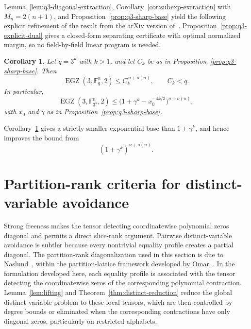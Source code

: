 \documentclass[10pt,a4paper]{amsart}
\newtheorem{corollary}[theorem]{Corollary}
\theoremstyle{definition}
\newcommand{\F}{\mathbb F}
\newcommand{\EGZ}{\operatorname{EGZ}}
\newcommand{\1}{\mathbf 1}
\begin{document}
Lemma~\ref{lem:q3-diagonal-extraction}, Corollary~\ref{cor:subexp-extraction} with $M_n=2(n+1)$, and Proposition~\ref{prop:q3-sharp-base} yield the following explicit refinement of the result from the arXiv version of~\cite{CostaDellaFiore}.  Proposition~\ref{prop:q3-explicit-dual} gives a closed-form separating certificate with optimal normalized margin, so no field-by-field linear program is needed.

\begin{corollary}\label{cor:original-310}
Let $q=3^k$ with $k>1$, and let $C_k$ be as in Proposition~\ref{prop:q3-sharp-base}.  Then
\[
 \EGZ(3,\F_q^n,2)\le C_k^{\,n+o(n)},
 \qquad C_k<q.
\]
In particular,
\[
 \EGZ(3,\F_{3^k}^n,2)
 \le\bigl(1+\gamma^k-x_0^{-4k/3}\bigr)^{n+o(n)},
\]
with $x_0$ and $\gamma$ as in Proposition~\ref{prop:q3-sharp-base}.
\end{corollary}

{
Corollary~\ref{cor:original-310} gives a strictly smaller exponential base than $1+\gamma^k$, and hence improves the bound from~\cite[Theorem~4.3]{CostaDellaFiore} $$(1+\gamma^k)^{n+o(n)}.$$}

\section{Partition-rank criteria for distinct-variable avoidance}\label{sec:partition-criteria}

Strong freeness makes the tensor detecting coordinatewise polynomial zeros diagonal and permits a direct slice-rank argument.  Pairwise distinct-variable avoidance is subtler because every nontrivial equality profile creates a partial diagonal.  The partition-rank diagonalization used in this section is due to Naslund~\cite{NaslundPartition}, within the partition-lattice framework developed by Omar~\cite{OmarPartition}.  In the formulation developed here, each equality profile is associated with the tensor detecting the coordinatewise zeros of the corresponding polynomial contraction.  Lemma~\ref{lem:lifting} and Theorem~\ref{thm:distinct-reduction} reduce the global distinct-variable problem to these local tensors, {which are then controlled by degree bounds or eliminated when the corresponding contractions have only diagonal zeros, particularly on restricted alphabets.}
\end{document}
